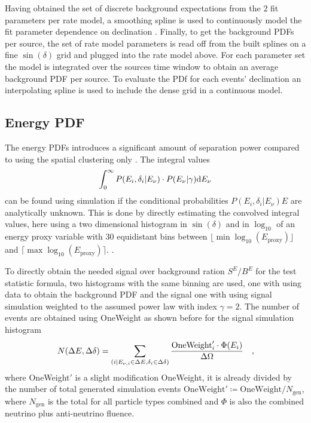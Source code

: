 Having obtained the set of discrete background expectations from the $2$ fit parameters per rate model, a smoothing spline is used to continuously model the fit parameter dependence on declination .
Finally, to get the background PDFs per source, the set of rate model parameters is read off from the built splines on a fine $\sin(\delta)$ grid and plugged into the rate model above.
For each parameter set the model is integrated over the sources time window to obtain an average background PDF per source.
To evaluate the PDf for each events' declination an interpolating spline is used to include the dense grid in a continuous model.

\subsection*{Energy PDF}
The energy PDFs introduces a significant amount of separation power compared to using the spatial clustering only .
The integral values
\begin{equation}
  \int_0^\infty P(E_i,\delta_i|E_\nu)\cdot P(E_\nu|\gamma) \mathrm{d}E_\nu
\end{equation}
can be found using simulation if the conditional probabilities $P(E_i,\delta_i|E_\nu)E$ are analytically unknown.
This is done by directly estimating the convolved integral values, here using a two dimensional histogram in $\sin(\delta)$ and in $\log_{10}$ of an energy proxy variable with $30$ equidistant bins between $\lfloor \min\log_{10}(E_\text{proxy}) \rfloor$ and $\lceil \max\log_{10}(E_\text{proxy}) \rceil$.
.

To directly obtain the needed signal over background ration $S^E / B^E$ for the test statistic formula, two histograms with the same binning are used, one with using data to obtain the background PDF and the signal one with using signal simulation weighted to the assumed power law with index $\gamma = 2$.
The number of events are obtained using OneWeight as shown before for the signal simulation histogram
\begin{equation}
  N(\Delta E, \Delta\delta)
  = \sum_{(i|E_{\nu,i}\in\Delta E, \delta_i\in\Delta\delta)}
    \frac{\text{OneWeight}'_i \cdot \Phi(E_i)}{\Delta\Omega}
  \quad\text{,}
\end{equation}
where OneWeight$'$ is a slight modification OneWeight, it is already divided by the number of total generated simulation events $\text{OneWeight}'\coloneqq\text{OneWeight}/N_\text{gen}$, where $N_\text{gen}$ is the total for all particle types combined and $\Phi$ is also the combined neutrino plus anti-neutrino fluence.

